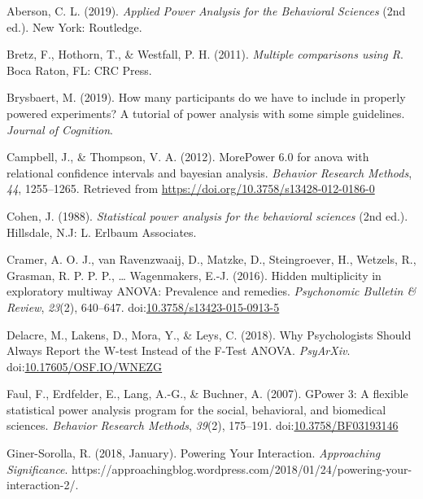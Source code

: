 \documentclass[
  ,man,floatsintext]{apa6}
\begin{document}
\setlength{\parindent}{-0.5in}
\setlength{\leftskip}{0.5in}

\hypertarget{refs}{}
\leavevmode\hypertarget{ref-aberson_applied_2019}{}%
Aberson, C. L. (2019). \emph{Applied Power Analysis for the Behavioral Sciences} (2nd ed.). New York: Routledge.

\leavevmode\hypertarget{ref-bretz_multiple_2011}{}%
Bretz, F., Hothorn, T., \& Westfall, P. H. (2011). \emph{Multiple comparisons using R}. Boca Raton, FL: CRC Press.

\leavevmode\hypertarget{ref-brysbaert_how_2019}{}%
Brysbaert, M. (2019). How many participants do we have to include in properly powered experiments? A tutorial of power analysis with some simple guidelines. \emph{Journal of Cognition}.

\leavevmode\hypertarget{ref-Campbell2012MorePower6F}{}%
Campbell, J., \& Thompson, V. A. (2012). MorePower 6.0 for anova with relational confidence intervals and bayesian analysis. \emph{Behavior Research Methods}, \emph{44}, 1255--1265. Retrieved from \url{https://doi.org/10.3758/s13428-012-0186-0}

\leavevmode\hypertarget{ref-cohen_statistical_1988}{}%
Cohen, J. (1988). \emph{Statistical power analysis for the behavioral sciences} (2nd ed.). Hillsdale, N.J: L. Erlbaum Associates.

\leavevmode\hypertarget{ref-cramer_hidden_2016}{}%
Cramer, A. O. J., van Ravenzwaaij, D., Matzke, D., Steingroever, H., Wetzels, R., Grasman, R. P. P. P., \ldots{} Wagenmakers, E.-J. (2016). Hidden multiplicity in exploratory multiway ANOVA: Prevalence and remedies. \emph{Psychonomic Bulletin \& Review}, \emph{23}(2), 640--647. doi:\href{https://doi.org/10.3758/s13423-015-0913-5}{10.3758/s13423-015-0913-5}

\leavevmode\hypertarget{ref-delacre_why_2018}{}%
Delacre, M., Lakens, D., Mora, Y., \& Leys, C. (2018). Why Psychologists Should Always Report the W-test Instead of the F-Test ANOVA. \emph{PsyArXiv}. doi:\href{https://doi.org/10.17605/OSF.IO/WNEZG}{10.17605/OSF.IO/WNEZG}

\leavevmode\hypertarget{ref-faul_gpower_2007}{}%
Faul, F., Erdfelder, E., Lang, A.-G., \& Buchner, A. (2007). GPower 3: A flexible statistical power analysis program for the social, behavioral, and biomedical sciences. \emph{Behavior Research Methods}, \emph{39}(2), 175--191. doi:\href{https://doi.org/10.3758/BF03193146}{10.3758/BF03193146}

\leavevmode\hypertarget{ref-giner-sorolla_powering_2018}{}%
Giner-Sorolla, R. (2018, January). Powering Your Interaction. \emph{Approaching Significance}. https://approachingblog.wordpress.com/2018/01/24/powering-your-interaction-2/.
\end{document}
